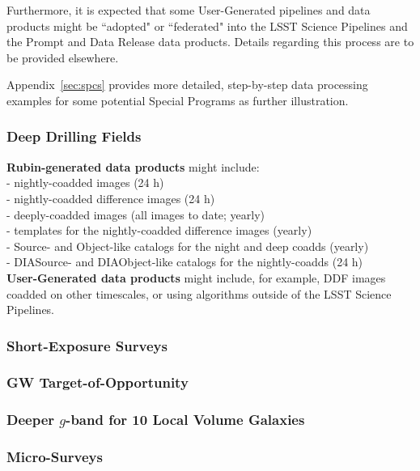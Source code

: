 \documentclass[DM,lsstdoc,toc]{lsstdoc}
\begin{document}
Furthermore, it is expected that some User-Generated pipelines and data products might be ``adopted" or ``federated" into the LSST Science Pipelines and the Prompt and Data Release data products. 
Details regarding this process are to be provided elsewhere.

Appendix~\ref{sec:spcs} provides more detailed, step-by-step data processing examples for some potential Special Programs as further illustration. 

\subsubsection{Deep Drilling Fields}

{\bf Rubin-generated data products} might include:\\
 - nightly-coadded images (24 h)\\
 - nightly-coadded difference images (24 h)\\
 - deeply-coadded images (all images to date; yearly)\\
 - templates for the nightly-coadded difference images (yearly)\\
 - Source- and Object-like catalogs for the night and deep coadds (yearly)\\
 - DIASource- and DIAObject-like catalogs for the nightly-coadds (24 h)\\

{\bf User-Generated data products} might include, for example, DDF images coadded on other timescales, or using algorithms outside of the LSST Science Pipelines.

\subsubsection{Short-Exposure Surveys}

\subsubsection{GW Target-of-Opportunity}

\subsubsection{Deeper $g$-band for 10 Local Volume Galaxies}

\subsubsection{Micro-Surveys}
\end{document}
